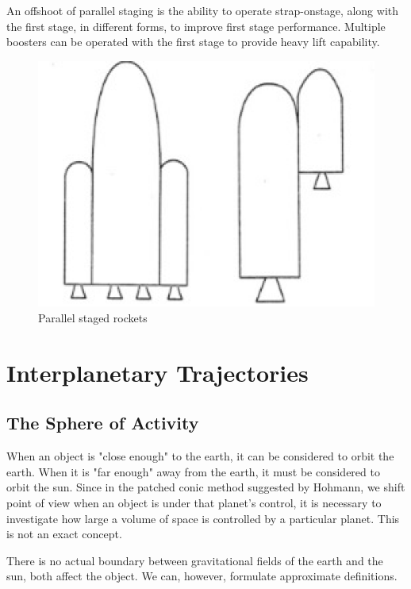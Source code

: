 \documentclass{article}
\theoremstyle{definition}
\begin{document}
An offshoot of parallel staging is the ability to operate strap-onstage, along with the first stage, in different forms, to improve first stage performance.
Multiple boosters can be operated with the first stage to provide heavy lift capability.

\begin{figure}[h]
    \centering
    \includegraphics[scale=0.3]{image 15.png}
    \caption{Parallel staged rockets}
    \label{fig:parallel stage}
\end{figure}


\section{Interplanetary Trajectories}

\subsection{The Sphere of Activity}

When an object is "close enough" to the earth, it can be considered to orbit the earth.
When it is "far enough" away from the earth, it must be considered to orbit the sun.
Since in the patched conic method suggested by Hohmann, we shift point of view when an object is under that planet's control, it is necessary to investigate how large a volume of space is controlled by a particular planet. 
This is not an exact concept.

There is no actual boundary between gravitational fields of the earth and the sun, both affect the object. We can, however, formulate approximate definitions.
\end{document}

